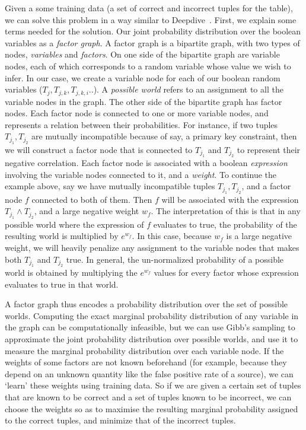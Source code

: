 \documentclass{sig-alternate}
\newcounter{prob}
\begin{document}
Given a some training data (a set of correct and incorrect tuples for the table), we can solve this problem in a way similar to Deepdive~\cite{deepdive,Niu_deepdive:web-scale}. First, we explain some terms needed for the solution. Our joint probability distribution over the boolean variables as a \textit{factor graph}. A factor graph is a bipartite graph, with two types of nodes, \textit{variables} and \textit{factors}. On one side of the bipartite graph are variable nodes, each of which corresponds to a random variable whose value we wish to infer. In our case, we create a variable node for each of our boolean random variables ($T_j, T_{j, k}, T_{j,k,i} ..$). A \textit{possible world} refers to an assignment to all the variable nodes in the graph. The other side of the bipartite graph has factor nodes. Each factor node is connected to one or more variable nodes, and represents a relation between their probabilities. For instance, if two tuples $T_{j_1}, T_{j_2}$ are mutually incompatible because of say, a primary key constraint, then we will construct a factor node that is connected to $T_{j_1}$ and $T_{j_2}$ to represent their negative correlation. Each factor node is associated with a boolean \textit{expression} involving the variable nodes connected to it, and a \textit{weight}. To continue the example above, say we have mutually incompatible tuples $T_{j_1}, T_{j_2}$, and a factor node $f$ connected to both of them. Then $f$ will be associated with the expression $T_{j_1} \land T_{j_2}$, and a large negative weight $w_f$. The interpretation of this is that in any possible world where the expression of $f$ evaluates to true, the probability of the resulting world is multiplied by $e^{w_f}$. In this case, because $w_f$ is a large negative weight, we will heavily penalize any assignment to the variable nodes that makes both $T_{j_1}$ and $T_{j_2}$ true. In general, the un-normalized probability of a possible world is obtained by multiplying the $e^{w_f}$ values for every factor whose expression evaluates to true in that world.

A factor graph thus encodes a probability distribution over the set of possible worlds. Computing the exact marginal probability distribution of any variable in the graph can be computationally infeasible, but we can use Gibb's sampling to approximate the joint probability distribution over possible worlds, and use it to measure the marginal probability distribution over each variable node. If the weights of some factors are not known beforehand (for example, because they depend on an unknown quantity like the false positive rate of a source), we can `learn' these weights using training data. So if we are given a certain set of tuples that are known to be correct and a set of tuples known to be incorrect, we can choose the weights so as to maximise the resulting marginal probability assigned to the correct tuples, and minimize that of the incorrect tuples. 
\end{document}
